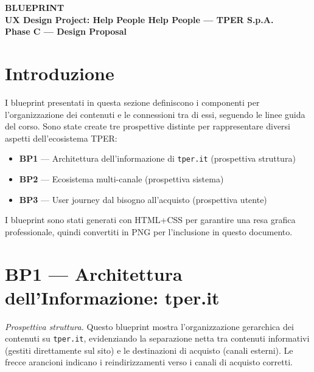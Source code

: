 \documentclass[11pt,a4paper]{article}
\begin{document}
\begin{tcolorbox}[colback=primaryColor,colframe=primaryColor,arc=3mm,halign=center,valign=center,height=2.5cm]
    \color{white}\LARGE\bfseries BLUEPRINT \\[0.2cm]
    \color{white!80}\large UX Design Project: Help People Help People --- TPER S.p.A. \\[0.1cm]
    \color{white!60}\normalsize Phase C --- Design Proposal
\end{tcolorbox}

\vspace{0.3cm}

\section{Introduzione}

I blueprint presentati in questa sezione definiscono i componenti per l'organizzazione dei contenuti e le connessioni tra di essi, seguendo le linee guida del corso. Sono state create tre prospettive distinte per rappresentare diversi aspetti dell'ecosistema TPER:

\begin{itemize}
    \item \textbf{BP1} --- Architettura dell'informazione di \texttt{tper.it} (prospettiva struttura)
    \item \textbf{BP2} --- Ecosistema multi-canale (prospettiva sistema)
    \item \textbf{BP3} --- User journey dal bisogno all'acquisto (prospettiva utente)
\end{itemize}

\noindent I blueprint sono stati generati con HTML+CSS per garantire una resa grafica professionale, quindi convertiti in PNG per l'inclusione in questo documento.

\vspace{0.3cm}

\section{BP1 --- Architettura dell'Informazione: tper.it}

\textit{Prospettiva struttura.} Questo blueprint mostra l'organizzazione gerarchica dei contenuti su \texttt{tper.it}, evidenziando la separazione netta tra contenuti informativi (gestiti direttamente sul sito) e le destinazioni di acquisto (canali esterni). Le frecce arancioni indicano i reindirizzamenti verso i canali di acquisto corretti.
\end{document}
